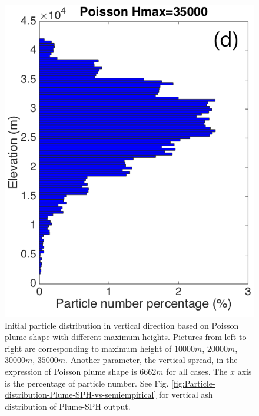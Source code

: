 \documentclass[draft,linenumbers]{agujournal2019}
\begin{document}
\begin{figure}[!htb]
\begin{minipage}{.247 \textwidth}
    \end{minipage}%
    \begin{minipage}{.247 \textwidth}
        \centering
        \includegraphics[width=0.99 \textwidth]{Figures/Possion-Hmax35k-ParticleDis-z}
    \end{minipage}%
    \caption{Initial particle distribution in vertical direction based on Poisson plume shape with different maximum heights. Pictures from left to right are corresponding to maximum height of $10000 m$,  $20000 m$,  $30000 m$, $35000 m$. Another parameter, the vertical spread, in the expression of Poisson plume shape is $6662 m$ for all cases. The $x$ axis is the percentage of particle number. See Fig. \ref{fig:Particle-distribution-Plume-SPH-vs-semiempirical} for vertical ash distribution of Plume-SPH output.}
    \label{fig:Particle-distribution-Plume-calibrate-semiempirical}
\end{figure}
\end{document}
